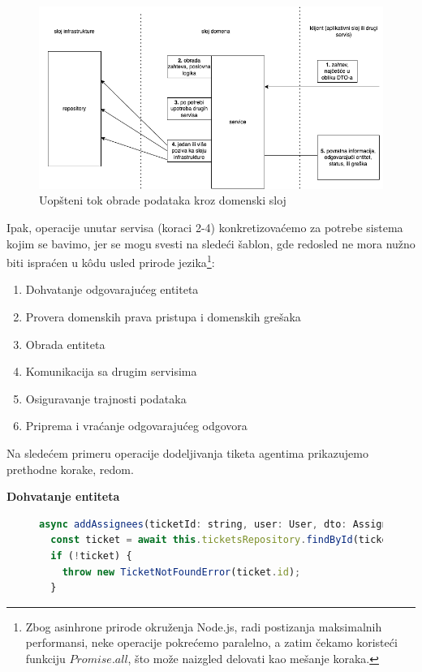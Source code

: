 \documentclass[12pt,oneside]{memoir}
\begin{document}
\begin{figure}[h]
  \centering
  \includegraphics[width=1\textwidth]{docs/images/ch_2/domain.png} 
  \caption{Uopšteni tok obrade podataka kroz domenski sloj}
  \label{fig:sample}
\end{figure}

Ipak, operacije unutar servisa (koraci 2-4) konkretizovaćemo za potrebe sistema kojim se bavimo, jer se mogu svesti na sledeći šablon, gde redosled ne mora nužno biti ispraćen u k\^{o}du usled prirode jezika\footnote{Zbog asinhrone prirode okruženja Node.js, radi postizanja maksimalnih performansi, neke operacije pokrećemo paralelno, a zatim čekamo koristeći funkciju $Promise.all$, što može naizgled delovati kao mešanje koraka.}:

\begin{enumerate}
  \item Dohvatanje odgovarajućeg entiteta
  \item Provera domenskih prava pristupa i domenskih grešaka
  \item Obrada entiteta
  \item Komunikacija sa drugim servisima
  \item Osiguravanje trajnosti podataka
  \item Priprema i vraćanje odgovarajućeg odgovora
\end{enumerate}

Na sledećem primeru operacije dodeljivanja tiketa agentima prikazujemo prethodne korake, redom.

\newpage
\textbf{Dohvatanje entiteta}

\begin{figure}[h]
\begin{lstlisting}[language=JavaScript, style=ES6, caption={dohvatanje tiketa}]
async addAssignees(ticketId: string, user: User, dto: AssignDTO) {
  const ticket = await this.ticketsRepository.findById(ticketId);
  if (!ticket) {
    throw new TicketNotFoundError(ticket.id);
  }
\end{lstlisting}
\end{figure}
\end{document}
